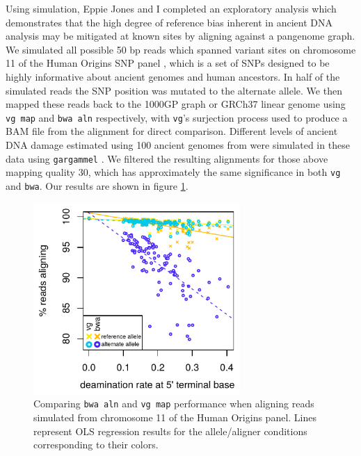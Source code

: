\documentclass[a4paper,12pt,numbered,oneside]{Classes/PhDThesisPSnPDF}
\begin{document}
Using simulation, Eppie Jones and I completed an exploratory analysis which demonstrates that the high degree of reference bias inherent in ancient DNA analysis may be mitigated at known sites by aligning against a pangenome graph.
We simulated all possible 50 bp reads which spanned variant sites on chromosome 11 of the Human Origins SNP panel \cite{patterson2012ancient,lazaridis2014ancient}, which is a set of SNPs designed to be highly informative about ancient genomes and human ancestors.
In half of the simulated reads the SNP position was mutated to the alternate allele.
We then mapped these reads back to the 1000GP graph or GRCh37 linear genome using {\tt vg map} and {\tt bwa aln} respectively, with {\tt vg}'s surjection process used to produce a BAM file from the alignment for direct comparison.
Different levels of ancient DNA damage estimated using 100 ancient genomes from \cite{allentoft2015population} were simulated in these data using {\tt gargammel} \cite{renaud2016gargammel}.
We filtered the resulting alignments for those above mapping quality 30, which has approximately the same significance in both {\tt vg} and {\tt bwa}.
Our results are shown in figure \ref{fig:aDNA_simulations}.

\begin{figure}[htbp!]
  \centering
  \includegraphics[width=0.7\textwidth]{Chapter3/Figs/bwa_vs_vg_ancient_data_simulations_mq30_recolored.pdf}
  \caption[Comparing {\tt bwa aln} and {\tt vg map} using simulated ancient DNA]{
    Comparing {\tt bwa aln} and {\tt vg map} performance when aligning reads simulated from chromosome 11 of the Human Origins panel.
    Lines represent OLS regression results for the allele/aligner conditions corresponding to their colors.
  }
  \label{fig:aDNA_simulations}
\end{figure}
\end{document}
